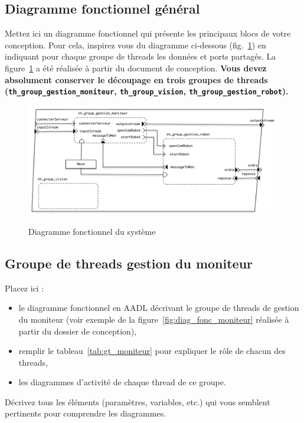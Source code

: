 \documentclass[11pt, a4paper]{paper}
\begin{document}
\subsection{Diagramme fonctionnel général}

{\color{red} Mettez ici un diagramme fonctionnel qui présente les principaux blocs de votre conception. Pour cela, inspirez vous du diagramme ci-dessous (fig.~\ref{fig:diag_fonc_gen}) en indiquant pour chaque groupe de threads les données et ports partagés. La figure~\ref{fig:diag_fonc_gen} a été réalisée à partir du document de conception. {\bf Vous devez absolument conserver le découpage en trois groupes de threads ({\tt th\_group\_gestion\_moniteur}, {\tt th\_group\_vision}, {\tt th\_group\_gestion\_robot}).}}

\begin{figure}[htbp]
\label{fig:diag_fonc_gen}
\begin{center}
{\includegraphics[scale=.5]{./figures-pdf/diag_fonc_gen}}
{\caption{Diagramme fonctionnel du système}}
\end{center}
\end{figure}
\FloatBarrier

\subsection{Groupe de threads gestion du moniteur}

{\color{red}Placez ici :
\begin{itemize}
\item le diagramme fonctionnel en AADL décrivant le groupe de threads de gestion du moniteur (voir exemple de la figure~\ref{fig:diag_fonc_moniteur} réalisée à partir du dossier de conception),
\item remplir le tableau~\ref{tab:gt_moniteur} pour expliquer le rôle de chacun des threads,
\item les diagrammes d'activité de chaque thread de ce groupe.
\end{itemize}

Décrivez tous les éléments (paramètres, variables, etc.) qui vous semblent pertinents pour comprendre les diagrammes.}
\end{document}
